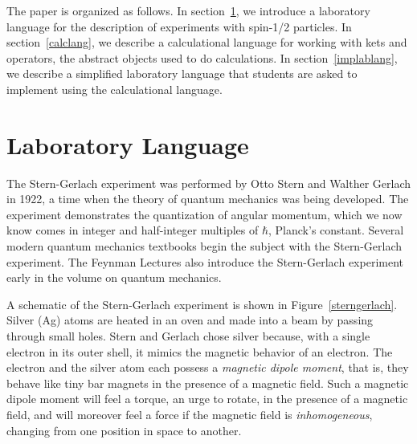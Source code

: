 \documentclass{eptcs}
\begin{document}
The paper is organized as follows.
In section~\ref{lablang}, we introduce a laboratory language
for the description of experiments with spin-1/2 particles.
In section~\ref{calclang}, we describe a calculational language
for working with kets and operators, the abstract objects
used to do calculations.
In section~\ref{implablang}, we describe a simplified laboratory
language that students are asked to implement using the
calculational language.

\section{Laboratory Language}
\label{lablang}

The Stern-Gerlach experiment was performed
by Otto Stern and Walther Gerlach in 1922, a time
when the theory of quantum mechanics was being developed.
The experiment demonstrates the quantization of angular
momentum, which we now know comes in integer and half-integer
multiples of $\hbar$, Planck's constant.
Several modern quantum mechanics textbooks begin the subject
with the Stern-Gerlach experiment.\cite{schumacherwestmoreland,townsend,sakurainapolitano}
The Feynman Lectures also introduce the Stern-Gerlach experiment
early in the volume on quantum mechanics.\cite{feynmanlectures3}

A schematic of the Stern-Gerlach experiment is shown in Figure~\ref{sterngerlach}.
Silver (Ag) atoms are heated in an oven and made into a beam by passing
through small holes.  Stern and Gerlach chose silver because, with a single
electron in its outer shell, it mimics the magnetic behavior of an electron.
The electron and the silver atom each possess a \emph{magnetic dipole moment},
that is, they behave like tiny bar magnets in the presence of a magnetic field.
Such a magnetic dipole moment will feel a torque, an urge to rotate, in the presence
of a magnetic field, and will moreover feel a force if the magnetic field
is \emph{inhomogeneous}, changing from one position in space to another.
\end{document}
